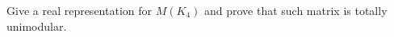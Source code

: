 \prob
{
    Give a real representation for $M(K_4)$ and prove that such matrix is totally unimodular.
}